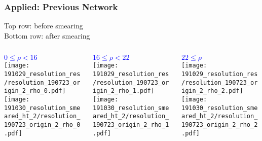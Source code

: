 \documentclass{beamer}
\begin{document}
\begin{frame}
  \frametitle{Applied: Previous Network}

  Top row: before smearing \\
  Bottom row: after smearing \\
  \vfill

  \begin{columns}
    \begin{column}{0.3\linewidth}
      \centering
      \textcolor{blue}{$0 \leq \rho < 16$} \\
      \texttt{[image: 191029\_resolution\_res/resolution\_190723\_origin\_2\_rho\_0.pdf]} \\
      \texttt{[image: 191030\_resolution\_smeared\_ht\_2/resolution\_190723\_origin\_2\_rho\_0.pdf]}
    \end{column}
    \begin{column}{0.3\linewidth}
      \centering
      \textcolor{blue}{$16 \leq \rho < 22$} \\
      \texttt{[image: 191029\_resolution\_res/resolution\_190723\_origin\_2\_rho\_1.pdf]} \\
      \texttt{[image: 191030\_resolution\_smeared\_ht\_2/resolution\_190723\_origin\_2\_rho\_1.pdf]}
    \end{column}
    \begin{column}{0.3\linewidth}
      \centering
      \textcolor{blue}{$22 \leq \rho$} \\
      \texttt{[image: 191029\_resolution\_res/resolution\_190723\_origin\_2\_rho\_2.pdf]} \\
      \texttt{[image: 191030\_resolution\_smeared\_ht\_2/resolution\_190723\_origin\_2\_rho\_2.pdf]}
    \end{column}
  \end{columns}

\end{frame}
\end{document}
